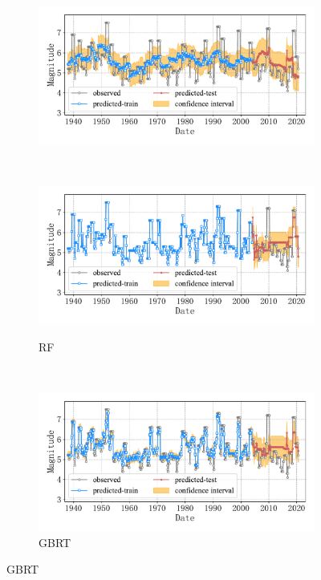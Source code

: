 \begin{figure}[!htbp]
\begin{subfigure}[b]{0.45\textwidth}
      \includegraphics[width=\textwidth]{Img/chap5_seism/total/seism_lr_minyear_1932_maxyear_2021_spanlat_2_spanlon_4_timewindow_72_nextmonth_12_minmag_3.0_blocks1.pdf}
      \vspace{-1cm}
      \label{fig:seism_lr_minyear_1932_maxyear_2021_spanlat_2_spanlon_4_timewindow_72_nextmonth_12_minmag_3.0_blocks1}
  \end{subfigure}
  ~
  \begin{subfigure}[b]{0.45\textwidth}
    \caption{RF}
    \vspace{-0.2cm}
    \includegraphics[width=\textwidth]{Img/chap5_seism/total/seism_rf_minyear_1932_maxyear_2021_spanlat_2_spanlon_4_timewindow_72_nextmonth_12_minmag_3.0_blocks1.pdf}
    \vspace{-1cm}
    \label{fig:seism_rf_minyear_1932_maxyear_2021_spanlat_2_spanlon_4_timewindow_72_nextmonth_12_minmag_3.0_blocks1}
  \end{subfigure}
  \\
  \begin{subfigure}[b]{0.45\textwidth}
    \caption{GBRT}
    \vspace{-0.2cm}
    \includegraphics[width=\textwidth]{Img/chap5_seism/total/seism_gbr_minyear_1932_maxyear_2021_spanlat_2_spanlon_4_timewindow_72_nextmonth_12_minmag_3.0_blocks1.pdf}

\end{subfigure}
\end{figure}
